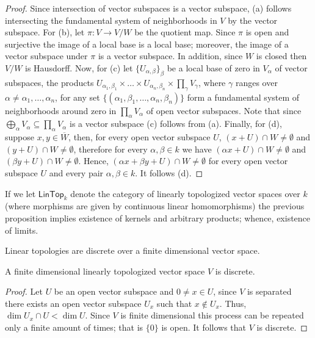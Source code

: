\begin{proof}
	Since intersection of vector subspaces is a vector subspace, (a) follows intersecting the fundamental system of neighborhoods in $V$ by the vector subspace. For (b), let $\pi\colon V \to V/W$ be the quotient map. Since $\pi$ is open and surjective the image of a local base is a local base; moreover, the image of a vector subspace under $\pi$ is a vector subspace. In addition, since $W$ is closed then $V/W$ is Hausdorff.  Now, for (c) let $\{U_{\alpha, \beta}\}_{\beta}$ be a local base of zero in $V_{\alpha}$ of vector subspaces, the products $U_{\alpha_{1}, \beta_{1}} \times \ldots \times U_{\alpha_{n}, \beta_{n}} \times \prod_{\gamma} V_{\gamma}$, where $\gamma$ ranges over $\alpha \neq \alpha_{1}, \ldots, \alpha_{n}$, for any set $\{(\alpha_{1}, \beta_{1}, \ldots, \alpha_{n}, \beta_{n})\}$ form a fundamental system of neighborhoods around zero in $\prod_{\alpha} V_{\alpha}$ of open vector subspaces. Note that since $\bigoplus_{\alpha} V_{\alpha} \subseteq \prod_{\alpha} V_{\alpha}$ is a vector subspace (c) follows from (a). Finally, for (d), suppose $x,y\in \overline{W}$, then, for every open vector subspace $U$, $(x + U)\cap W \neq \emptyset$ and $(y + U)\cap W \neq \emptyset$, therefore for every $\alpha, \beta \in k$ we have $(\alpha x + U)\cap W \neq \emptyset$ and $(\beta y + U)\cap W \neq \emptyset$. Hence, $(\alpha x + \beta y + U)\cap W\neq \emptyset$ for every open vector subspace $U$ and every pair $\alpha, \beta\in k$. It follows (d).
\end{proof}
\begin{remark}\label{rem:limits-and-colimits-in-lintop-category}
	If we let $\mathsf{LinTop}_{k}$ denote the category of linearly topologized vector spaces over $k$ (where morphisms are given by continuous linear homomorphisms) the previous proposition implies existence of kernels and arbitrary products; whence, existence of limits.  
\end{remark}
Linear topologies are discrete over a finite dimensional vector space.
\begin{proposition}\label{prop:finite_dimensional_linear_topologies}
A finite dimensional linearly topologized vector space $V$ is discrete.
\end{proposition}
\begin{proof}
	Let $U$ be an open vector subspace and $0 \neq x \in U$, since $V$ is separated there exists an open vector subspace $U_{x}$ such that $x \not\in U_{x}$. Thus, $\dim U_{x} \cap U < \dim U$. Since $V$ is finite dimensional this process can be repeated only a finite amount of times; that is $\{0\}$ is open. It follows that $V$ is discrete.
\end{proof}
